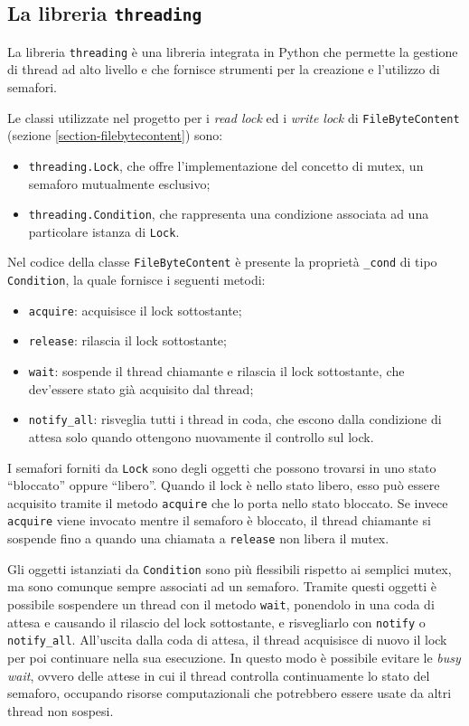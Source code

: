 \documentclass[a4paper,12pt,twoside,openright]{report}
\begin{document}
  \subsection{La libreria \texttt{threading}}
  \label{section-lib-threading}

  La libreria \texttt{threading} \cite{pythreading} è una libreria integrata in Python che permette
  la gestione di thread ad alto livello e che fornisce strumenti per la creazione e l'utilizzo di semafori.

  Le classi utilizzate nel progetto per i \textit{read lock} ed i \textit{write lock} di \texttt{FileByteContent}
  (sezione \ref{section-filebytecontent}) sono:
  \begin{itemize}
    \item \texttt{threading.Lock}, che offre l'implementazione del concetto di mutex, un semaforo mutualmente esclusivo;
    \item \texttt{threading.Condition}, che rappresenta una condizione associata ad una particolare istanza di \texttt{Lock}.
  \end{itemize}

  Nel codice della classe \texttt{FileByteContent} è presente la proprietà \texttt{\_cond} di tipo \texttt{Condition},
  la quale fornisce i seguenti metodi:
  \begin{itemize}
    \item \texttt{acquire}: acquisisce il lock sottostante;
    \item \texttt{release}: rilascia il lock sottostante;
    \item \texttt{wait}: sospende il thread chiamante e rilascia il lock sottostante, che dev'essere stato già acquisito dal thread;
    \item \texttt{notify\_all}: risveglia tutti i thread in coda, che escono dalla condizione di attesa solo quando ottengono nuovamente il controllo sul lock.
  \end{itemize}

  I semafori forniti da \texttt{Lock} sono degli oggetti che possono trovarsi in uno stato ``bloccato''
  oppure ``libero''. Quando il lock è nello stato libero, esso può essere acquisito tramite il metodo \texttt{acquire}
  che lo porta nello stato bloccato. Se invece \texttt{acquire} viene invocato mentre il semaforo è bloccato,
  il thread chiamante si sospende fino a quando una chiamata a \texttt{release} non libera il mutex.

  Gli oggetti istanziati da \texttt{Condition} sono più flessibili rispetto ai semplici \mbox{mutex}, ma 
  sono comunque sempre associati ad un semaforo.
  Tramite questi oggetti è possibile sospendere un thread con il metodo \texttt{wait}, ponendolo in una coda di attesa
  e causando il rilascio del lock sottostante, e risvegliarlo con \texttt{notify} o \texttt{notify\_all}.
  All'uscita dalla coda di attesa, il thread acquisisce di nuovo il lock per poi continuare nella sua esecuzione.
  In questo modo è possibile evitare le \textit{busy wait}, ovvero delle attese in cui
  il thread controlla continuamente lo stato del semaforo, occupando risorse computazionali che potrebbero
  essere usate da altri thread non sospesi.
\end{document}
